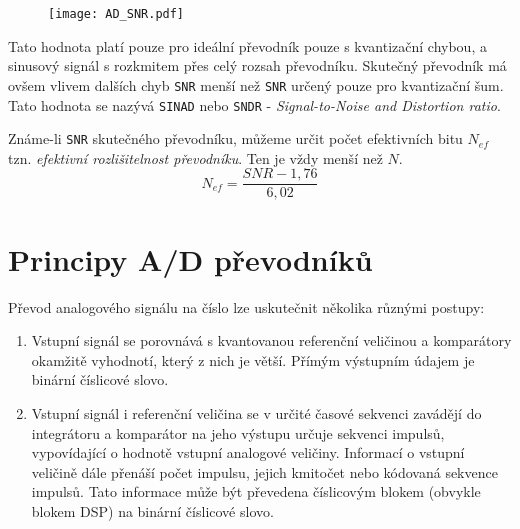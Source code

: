         \begin{figure}[ht!]
            \centering
            \texttt{[image: AD\_SNR.pdf]}
            \caption{}
            \label{AES:fig_SNR}
        \end{figure}

        Tato hodnota platí pouze pro ideální převodník pouze s kvantizační chybou, a sinusový 
        signál s rozkmitem přes celý rozsah převodníku.  Skutečný převodník má ovšem vlivem dalších 
        chyb \texttt{SNR} menší než \texttt{SNR} určený pouze pro kvantizační šum. Tato hodnota se 
        nazývá \texttt{SINAD} nebo \texttt{SNDR} - \emph{Signal-to-Noise and Distortion ratio}.

        Známe-li \texttt{SNR} skutečného převodníku, můžeme určit počet efektivních bitu $N_{ef}$ 
        tzn. \emph{efektivní rozlišitelnost převodníku}. Ten je vždy menší než $N$.
        \begin{equation}\label{AES_eq_N_ef}
            N_{ef} = \frac{SNR - 1,76}{6,02}
        \end{equation}
        
  \section{Principy A/D převodníků}
      Převod analogového signálu na číslo lze uskutečnit několika různými postupy:\cite{Neumann}
      \begin{enumerate}[noitemsep]
        \item Vstupní signál se porovnává s kvantovanou referenční veličinou a komparátory okamžitě 
              vyhodnotí, který z nich je větší. Přímým výstupním údajem je binární číslicové slovo.
        \item Vstupní signál i referenční veličina se v určité časové sekvenci zavádějí do   
              integrátoru a komparátor na jeho výstupu určuje sekvenci impulsů, vypovídající o 
              hodnotě vstupní analogové veličiny. Informací o vstupní veličině dále přenáší počet 
              impulsu, jejich kmitočet nebo kódovaná sekvence impulsů. Tato informace může být 
              převedena číslicovým blokem (obvykle blokem DSP) na binární číslicové slovo.
      \end{enumerate}

